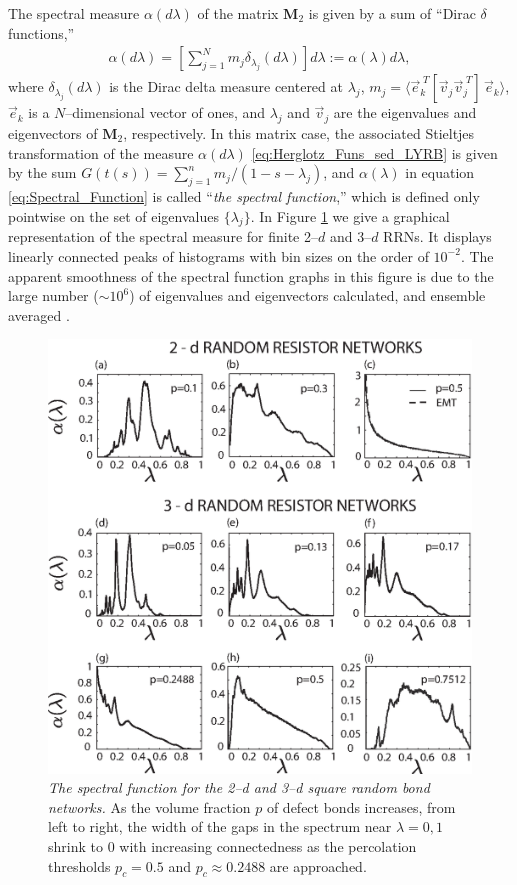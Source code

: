 \documentclass[english,12pt,jmp,graphicx]{revtex4-1}
\begin{document}
The spectral measure $\alpha(d\lambda)$ of the matrix $\mathbf{M}_2$ is given by
a sum of ``Dirac $\delta$ functions,''
%
\begin{align}\label{eq:Spectral_Function}
  \alpha(d\lambda)=
    \left[\sum_{j=1}^N m_j \delta_{\lambda_j}(d\lambda)\right]d\lambda
      :=\alpha(\lambda)d\lambda,
\end{align}
%
where $\delta_{\lambda_j}(d\lambda)$ is the Dirac delta measure centered at $\lambda_j$,
$m_j=\langle\vec{e}_k^{\;T}[\vec{v}_j\vec{v}_j^{\;T}]\,\vec{e}_k\rangle$, 
$\vec{e}_k$ is a $N$--dimensional vector of ones, and $\lambda_j$ and
$\vec{v}_j$ are the eigenvalues and eigenvectors of $\mathbf{M}_2$,
respectively. In this matrix case, the associated Stieltjes
transformation of the measure $\alpha(d\lambda)$ \eqref{eq:Herglotz_Funs_sed_LYRB} is
given by the sum $G(t(s))=\sum_{j=1}^nm_j/(1-s-\lambda_j)$, and $\alpha(\lambda)$ in equation
\eqref{eq:Spectral_Function} is called ``\emph{the spectral
  function},'' which is defined only pointwise on the set of
eigenvalues $\{\lambda_j\}$. In Figure \ref{fig:2D-RRN} we give a graphical
representation of the spectral measure for finite 2--$d$ and 3--$d$
RRNs. It displays linearly connected peaks of histograms with bin
sizes on the order of $10^{-2}$. The apparent smoothness of the
spectral function graphs in this figure is due to the large number
($\sim10^6$) of eigenvalues and eigenvectors calculated, and ensemble
averaged \cite{Golden:JoB:337}. 
%
\begin{figure}\label{fig:2D-RRN}
\includegraphics[width=39pc]{2-3-d_Random_Resistor_Networks.eps}%
\caption{\emph{The spectral function for the 2--d and 3--d square random bond
    networks.} As the volume fraction $p$ of defect bonds increases,
  from left to right, the width of the gaps in the spectrum near
  $\lambda=0,1$ shrink to 0 with increasing connectedness as the percolation
  thresholds $p_c=0.5$ and $p_c\approx0.2488$ are approached.}%
\end{figure}
%
\end{document}

